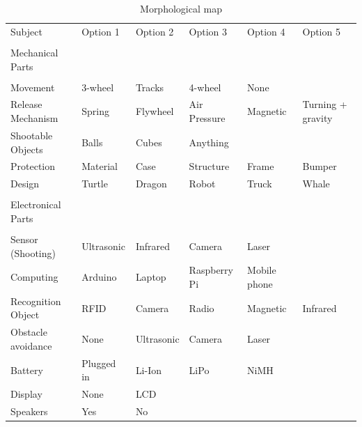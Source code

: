 \documentclass[11pt,twoside,a4paper]{report}
\begin{document}
\begin{table}[h]

\begin{tabular}{llllll}
Subject            & Option 1          & Option 2   & Option 3     & Option 4     & Option 5          \\
                   &                   &            &              &              &                   \\
Mechanical Parts   &                   &            &              &              &                   \\
                   &                   &            &              &              &                   \\
Movement           & 3-wheel           & Tracks     & 4-wheel      & None         &                   \\
Release Mechanism  & Spring            & Flywheel   & Air Pressure & Magnetic     & Turning + gravity \\
Shootable Objects  & Balls             & Cubes      & Anything     &              &                   \\
Protection         & Material          & Case       & Structure    & Frame        & Bumper            \\
Design             & Turtle            & Dragon     & Robot        & Truck        & Whale             \\
                   &                   &            &              &              &                   \\
Electronical Parts &                   &            &              &              &                   \\
                   &                   &            &              &              &                   \\
Sensor (Shooting)  & Ultrasonic        & Infrared   & Camera       & Laser        &                   \\
Computing          & Arduino           & Laptop     & Raspberry Pi & Mobile phone &                   \\
Recognition Object & RFID              & Camera     & Radio        & Magnetic     & Infrared          \\
Obstacle avoidance & None              & Ultrasonic & Camera       & Laser        &                   \\
Battery            & Plugged in & Li-Ion     & LiPo         & NiMH         &                   \\
Display				& None & LCD & & & \\
Speakers 			& Yes & No & & & 
\end{tabular}

\caption{Morphological map}
\label{table:morphologicalmap}
\end{table}
\end{document}
